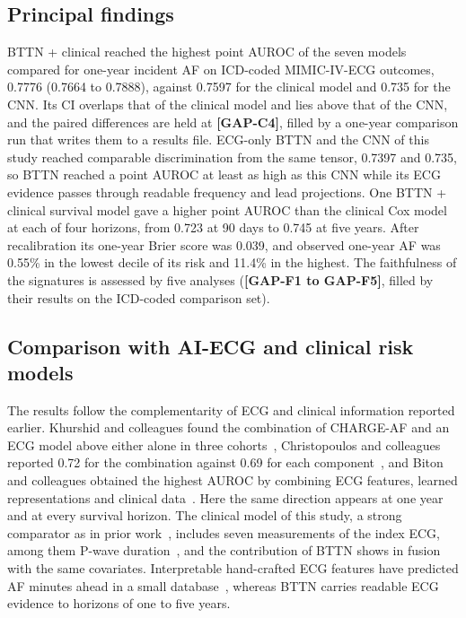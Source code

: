 \documentclass[preprint,12pt]{elsarticle}
\begin{document}
\subsection{Principal findings}

BTTN + clinical reached the highest point AUROC of the seven models compared for one-year incident AF on ICD-coded MIMIC-IV-ECG outcomes, 0.7776 (0.7664 to 0.7888), against 0.7597 for the clinical model and 0.735 for the CNN. Its CI overlaps that of the clinical model and lies above that of the CNN, and the paired differences are held at \textbf{[GAP-C4]}, filled by a one-year comparison run that writes them to a results file. ECG-only BTTN and the CNN of this study reached comparable discrimination from the same tensor, 0.7397 and 0.735, so BTTN reached a point AUROC at least as high as this CNN while its ECG evidence passes through readable frequency and lead projections. One BTTN + clinical survival model gave a higher point AUROC than the clinical Cox model at each of four horizons, from 0.723 at 90 days to 0.745 at five years. After recalibration its one-year Brier score was 0.039, and observed one-year AF was 0.55\% in the lowest decile of its risk and 11.4\% in the highest. The faithfulness of the signatures is assessed by five analyses (\textbf{[GAP-F1 to GAP-F5]}, filled by their results on the ICD-coded comparison set).

\subsection{Comparison with AI-ECG and clinical risk models}

The results follow the complementarity of ECG and clinical information reported earlier. Khurshid and colleagues found the combination of CHARGE-AF and an ECG model above either alone in three cohorts~\cite{khurshid2022}, Christopoulos and colleagues reported 0.72 for the combination against 0.69 for each component~\cite{christopoulos2020}, and Biton and colleagues obtained the highest AUROC by combining ECG features, learned representations and clinical data~\cite{biton2021}. Here the same direction appears at one year and at every survival horizon. The clinical model of this study, a strong comparator as in prior work~\cite{alonso2013}, includes seven measurements of the index ECG, among them P-wave duration~\cite{nielsen2015}, and the contribution of BTTN shows in fusion with the same covariates. Interpretable hand-crafted ECG features have predicted AF minutes ahead in a small database~\cite{hammer2022}, whereas BTTN carries readable ECG evidence to horizons of one to five years.
\end{document}
